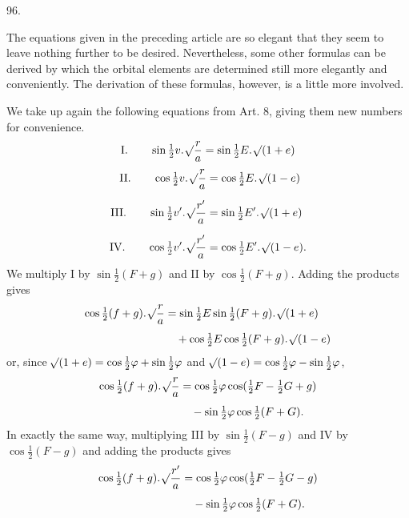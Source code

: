 \par{}\medskip
\hypertarget{native-130-article096}{}
\begin{center}96.\end{center}
The equations given in the preceding article are so elegant that they seem to leave nothing further to be desired. Nevertheless, some other formulas can be derived by which the orbital elements are determined still more elegantly and conveniently. The derivation of these formulas, however, is a little more involved.

We take up again the following equations from Art. 8, giving them new numbers for convenience.
\[
\mathrm{I.}\qquad \sin\tfrac12 v\mathpunct{.}\mathord{{}^{}\!\surd}\dfrac{r}{a}=\sin\tfrac12 E\mathpunct{.}\mathord{{}^{}\!\surd}(1+e)
\]
\[
\begin{aligned}
\mathrm{II.}\qquad \cos\tfrac12 v\mathpunct{.}\mathord{{}^{}\!\surd}\dfrac{r}{a}&=\cos\tfrac12 E\mathpunct{.}\mathord{{}^{}\!\surd}(1-e)\\[6pt]
\mathrm{III.}\qquad \sin\tfrac12 v'\mathpunct{.}\mathord{{}^{}\!\surd}\dfrac{r'}{a}&=\sin\tfrac12 E'\mathpunct{.}\mathord{{}^{}\!\surd}(1+e)\\[6pt]
\mathrm{IV.}\qquad \cos\tfrac12 v'\mathpunct{.}\mathord{{}^{}\!\surd}\dfrac{r'}{a}&=\cos\tfrac12 E'\mathpunct{.}\mathord{{}^{}\!\surd}(1-e).
\end{aligned}
\]
We multiply I by $\sin\frac12(F+g)$ and II by $\cos\frac12(F+g)$. Adding the products gives
\[
\begin{aligned}
\cos\tfrac12(f+g)\mathpunct{.}\mathord{{}^{}\!\surd}\dfrac{r}{a}&=\sin\tfrac12 E\sin\tfrac12(F+g)\mathpunct{.}\mathord{{}^{}\!\surd}(1+e)\\[4pt]
&\quad+\cos\tfrac12 E\cos\tfrac12(F+g)\mathpunct{.}\mathord{{}^{}\!\surd}(1-e)
\end{aligned}
\]
or, since $\mathord{{}^{}\!\surd}(1+e)=\cos\frac12\varphi+\sin\frac12\varphi$ and $\mathord{{}^{}\!\surd}(1-e)=\cos\frac12\varphi-\sin\frac12\varphi$,
\[
\begin{aligned}
\cos\tfrac12(f+g)\mathpunct{.}\mathord{{}^{}\!\surd}\dfrac{r}{a}&=\cos\tfrac12\varphi\cos(\tfrac12 F-\tfrac12 G+g)\\[4pt]
&\quad-\sin\tfrac12\varphi\cos\tfrac12(F+G).
\end{aligned}
\]
In exactly the same way, multiplying III by $\sin\frac12(F-g)$ and IV by $\cos\frac12(F-g)$ and adding the products gives
\[
\begin{aligned}
\cos\tfrac12(f+g)\mathpunct{.}\mathord{{}^{}\!\surd}\dfrac{r'}{a}&=\cos\tfrac12\varphi\cos(\tfrac12 F-\tfrac12 G-g)\\[4pt]
&\quad-\sin\tfrac12\varphi\cos\tfrac12(F+G).
\end{aligned}
\]

